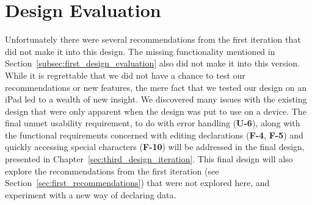 \section{Design Evaluation}
\label{second_design_evaluation}
Unfortunately there were several recommendations from the first iteration that did not make it into this design. 
The missing functionality mentioned in Section~\ref{subsec:first_design_evaluation} also did not make it into this version.
While it is regrettable that we did not have a chance to test our recommendations or new features, the mere fact that we tested our design on an iPad led to a wealth of new insight.
We discovered many issues with the existing design that were only apparent when the design was put to use on a device. 
The final unmet usability requirement, to do with error handling (\textbf{U-6}), along with the functional requirements concerned with editing declarations (\textbf{F-4}, \textbf{F-5}) and quickly accessing special characters (\textbf{F-10}) will be addressed in the final design, presented in Chapter~\ref{sec:third_design_iteration}. 
This final design will also explore the recommendations from the first iteration (see Section~\ref{sec:first_recommendations}) that were not explored here, and experiment with a new way of declaring data.
